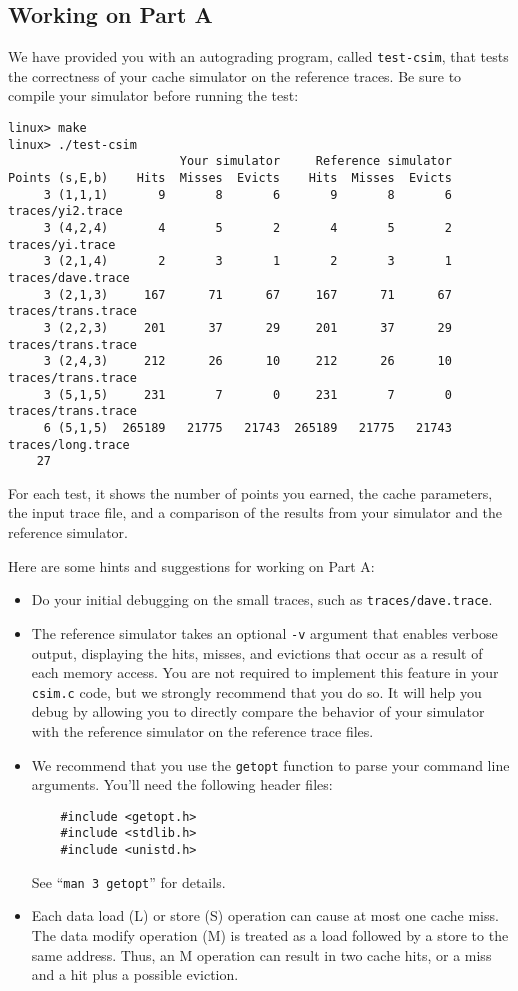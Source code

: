 \documentclass[11pt]{article}
\begin{document}
\subsection{Working on Part A}
We have provided you with an autograding program, called
\verb:test-csim:, that tests the correctness of your cache simulator
on the reference traces. Be sure to compile your simulator before
running the test:
{\small
\begin{verbatim}
linux> make
linux> ./test-csim
                        Your simulator     Reference simulator
Points (s,E,b)    Hits  Misses  Evicts    Hits  Misses  Evicts
     3 (1,1,1)       9       8       6       9       8       6  traces/yi2.trace
     3 (4,2,4)       4       5       2       4       5       2  traces/yi.trace
     3 (2,1,4)       2       3       1       2       3       1  traces/dave.trace
     3 (2,1,3)     167      71      67     167      71      67  traces/trans.trace
     3 (2,2,3)     201      37      29     201      37      29  traces/trans.trace
     3 (2,4,3)     212      26      10     212      26      10  traces/trans.trace
     3 (5,1,5)     231       7       0     231       7       0  traces/trans.trace
     6 (5,1,5)  265189   21775   21743  265189   21775   21743  traces/long.trace
    27
\end{verbatim}
}

For each test, it shows the number of points you earned, the cache
parameters, the input trace file, and a comparison of the results from
your simulator and the reference simulator.

Here are some hints and suggestions for working on Part A:
\begin{itemize}
\item Do your initial debugging on the small traces, such as
  \verb:traces/dave.trace:.

\item The reference simulator takes an optional \texttt{-v} argument
  that enables verbose output, displaying the hits, misses, and
  evictions that occur as a result of each memory access. You are
  not required to implement this feature in your {\tt csim.c} code,
  but we strongly recommend that you do so.  It will help you debug by
  allowing you to directly compare the behavior of your simulator with
  the reference simulator on the reference trace files.

\item We recommend that you use the {\tt getopt} function to parse
  your command line arguments. You'll need the following header files:
\begin{verbatim}
    #include <getopt.h>
    #include <stdlib.h>
    #include <unistd.h>
\end{verbatim}
See ``{\tt man 3 getopt}'' for details.

\item Each data load (L) or store (S) operation can cause at most one
  cache miss.  The data modify operation (M) is treated as a load
  followed by a store to the same address. Thus, an M operation can
  result in two cache hits, or a miss and a hit plus a possible
  eviction.

\end{itemize}
\end{document}
